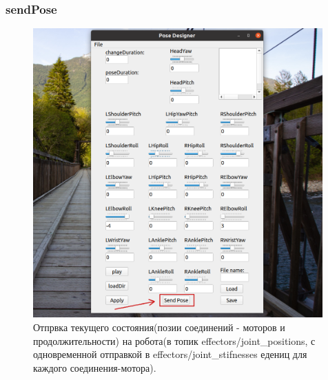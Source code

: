\documentclass[12pt,a4paper]{article}
\begin{document}
\subsubsection{sendPose}
\label{sendPose}
\begin{figure}[h!]
    \centering
    \includegraphics[width=0.99\textwidth]{images/sendPose.png}
    \caption{Отпрвка текущего состояния(позии соединений - моторов и продолжительности) на робота(в топик effectors/joint\_positions, с одновременной отправкой в effectors/joint\_stifnesses едениц для каждого соединения-мотора).}
    \label{fig:file}
\end{figure}
\newpage
\end{document}
